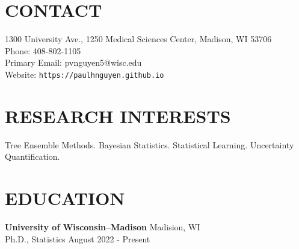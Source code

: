 \documentclass[margin]{res}
\begin{document}
  
                        
\begin{resume}                        
  
  \section{CONTACT} 
  1300 University Ave., 1250 Medical Sciences Center, Madison, WI 53706 \\
  Phone: 408-802-1105 \\ 
  Primary Email: pvnguyen5@wisc.edu \\
  Website: \texttt{https://paulhnguyen.github.io}

  \section{RESEARCH INTERESTS}
  Tree Ensemble Methods. Bayesian Statistics. Statistical Learning. Uncertainty Quantification.
              


              
\section{EDUCATION}      
                {\bf University of Wisconsin--Madison} \hfill Madision, WI \\
                Ph.D., Statistics \hfill August 2022 - Present \\
                

\end{resume}
\end{document}

